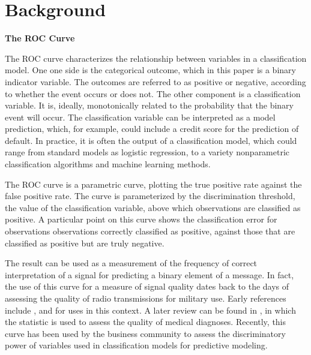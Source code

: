 



\section{Background}
\textbf{The ROC Curve}

The ROC curve characterizes the relationship between variables in a classification model. 
One one side is the categorical outcome, which in this paper is a binary indicator variable. 
The outcomes are referred to as positive or negative, according to whether the event occurs or does not. 
The other component is a classification variable. 
It is, ideally, monotonically related to the probability that the binary event will occur. 
The classification variable can be interpreted as a model prediction, which, for example, could include a credit score for the prediction of default. 
In practice, it is often the output of a classification model, which could range from standard models as logistic regression, to a variety nonparametric classification algorithms and machine learning methods.

The ROC curve is a parametric curve, plotting the true positive rate against the false positive rate. 
The curve is parameterized by the discrimination threshold, the value of the classification variable, above which observations are classified as positive. 
A particular point on this curve shows the classification error for observations observations correctly classified as positive, against those that are classified as positive but are truly negative.

The result can be used as a measurement of the frequency of correct interpretation of a signal for predicting a binary element of a message. 
In fact, the use of this curve for a measure of signal quality dates back to the days of assessing the quality of radio transmissions for military use.
Early references include \citet{peterson1954}, \citet{vanmeter1954} and \citet{wald1949} for uses in this context.
A later review can be found in \citet{hanley1989}, in which the statistic is used to assess the quality of medical diagnoses.
Recently, this curve has been used by the business community to assess the discriminatory power of variables used in classification models for predictive modeling.

